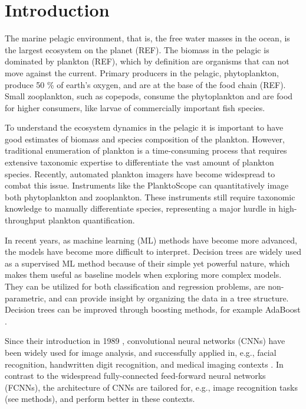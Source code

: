 \section{Introduction}\label{sec:introduction}

The marine pelagic environment, that is, the free water masses in the ocean, is the largest ecosystem on the planet (REF). The biomass in the pelagic is dominated by plankton (REF), which by definition are organisms that can not move against the current. Primary producers in the pelagic, phytoplankton, produce 50 \% of earth's oxygen, and are at the base of the food chain (REF). Small zooplankton, such as copepods, consume the phytoplankton and are food for higher consumers, like larvae of commercially important fish species.

To understand the ecosystem dynamics in the pelagic it is important to have good estimates of biomass and species composition of the plankton. However, traditional enumeration of plankton is a time-consuming process that requires extensive taxonomic expertise to differentiate the vast amount of plankton species. Recently, automated plankton imagers have become widespread to combat this issue. Instruments like the PlanktoScope \cite{pollina2022:planktoscope} can quantitatively image both phytoplankton and zooplankton. These instruments still require taxonomic knowledge to manually differentiate species, representing a major hurdle in high-throughput plankton quantification.

In recent years, as machine learning (ML) methods have become more advanced, the models have become more difficult to interpret. Decision trees are widely used as a supervised ML method because of their simple yet powerful nature, which makes them useful as baseline models when exploring more complex models. They can be utilized for both classification and regression problems, are non-parametric, and can provide insight by organizing the data in a tree structure. Decision trees can be improved through boosting methods, for example AdaBoost \cite{zou2009}.

Since their introduction in 1989 \cite{lecun1989}, convolutional neural networks (CNNs) have been widely used for image analysis, and successfully applied in, e.g., facial recognition, handwritten digit recognition, and medical imaging contexts \cite{li2022}. In contrast to the widespread fully-connected feed-forward neural networks (FCNNs), the architecture of CNNs are tailored for, e.g., image recognition tasks (see methods), and perform better in these contexts. 

